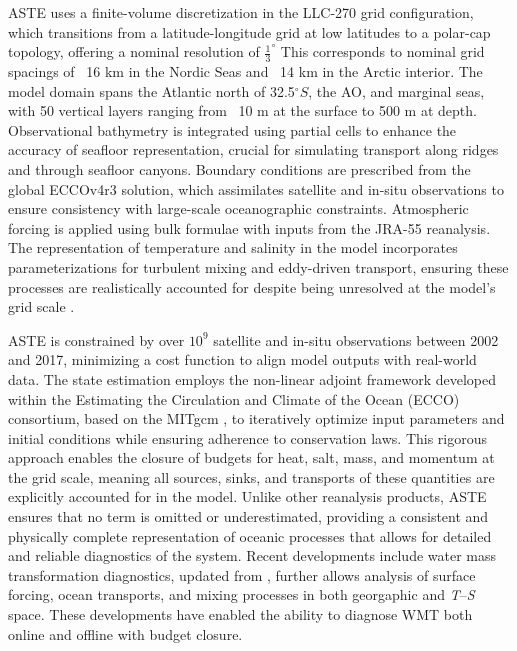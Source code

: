 \documentclass[draft]{agujournal2019}
\begin{document}
ASTE uses a finite-volume discretization in the LLC-270 grid configuration, which transitions from a latitude-longitude grid at low latitudes to a polar-cap topology, offering a nominal resolution of $\frac{1}{3}^\circ$ This corresponds to nominal grid spacings of ~16 km in the Nordic Seas and ~14 km in the Arctic interior. The model domain spans the Atlantic north of 32.5$^\circ S$, the AO, and marginal seas, with 50 vertical layers ranging from ~10 m at the surface to 500 m at depth. Observational bathymetry is integrated using partial cells to enhance the accuracy of seafloor representation, crucial for simulating transport along ridges and through seafloor canyons. Boundary conditions are prescribed from the global ECCOv4r3 solution, which assimilates satellite and in-situ observations to ensure consistency with large-scale oceanographic constraints. Atmospheric forcing is applied using bulk formulae with inputs from the JRA-55 reanalysis. The representation of temperature and salinity in the model incorporates parameterizations for turbulent mixing and eddy-driven transport, ensuring these processes are realistically accounted for despite being unresolved at the model's grid scale .

ASTE is constrained by over $10^9$ satellite and in-situ observations between 2002 and 2017, minimizing a cost function to align model outputs with real-world data. The state estimation employs the non-linear adjoint framework developed within the Estimating the Circulation and Climate of the Ocean (ECCO) consortium, based on the MITgcm \cite{marshall_1997}, to iteratively optimize input parameters and initial conditions while ensuring adherence to conservation laws. This rigorous approach enables the closure of budgets for heat, salt, mass, and momentum at the grid scale, meaning all sources, sinks, and transports of these quantities are explicitly accounted for in the model. Unlike other reanalysis products, ASTE ensures that no term is omitted or underestimated, providing a consistent and physically complete representation of oceanic processes that allows for detailed and reliable diagnostics of the system. Recent developments include water mass transformation diagnostics, updated from , further allows analysis of surface forcing, ocean transports, and mixing processes in both georgaphic and \emph{T}--\emph{S} space. These developments have enabled the ability to diagnose WMT both online and offline with budget closure.
\end{document}
